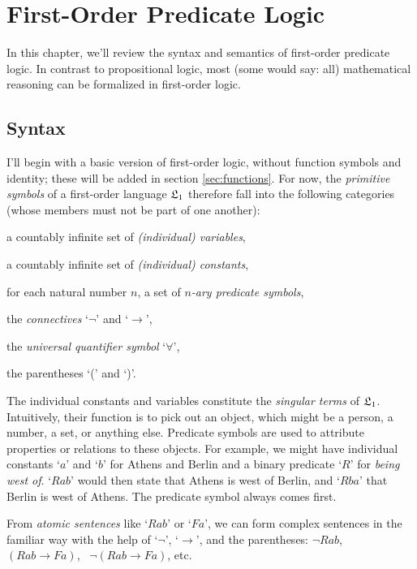 \setcounter{chapter}{1}
\chapter{First-Order Predicate Logic}

In this chapter,
we'll review the syntax and semantics of first-order predicate logic.
In contrast to propositional logic,
most
(some would say: all)
mathematical reasoning can be formalized in first-order logic.

\section{Syntax}\label{sec:syntax1}

I'll begin with a basic version of first-order logic,
without function symbols and identity;
these will be added in section \ref{sec:functions}.
For now,
the \emph{primitive symbols} of a first-order language $\mathfrak{L}_1$
therefore fall into
the following categories
(whose members must not be part of one another):
%
\begin{itemize*}
\item a countably infinite set of \textit{(individual) variables},
\item a countably infinite set of \textit{(individual) constants},
\item for each natural number $n$, a set of \textit{$n$-ary predicate symbols},
\item the \textit{connectives} `$\neg$' and `$\to$',
\item the \textit{universal quantifier symbol} `$\forall$',
\item the parentheses `(' and `)'.
\end{itemize*}

The individual constants and variables constitute the \emph{singular terms} of $\mathfrak{L}_1$.
Intuitively,
their function is to pick out an object,
which might be a person, a number, a set, or anything else.
Predicate symbols are used to attribute properties or relations to these objects.
For example,
we might have individual constants `$a$' and `$b$' for Athens and Berlin
and a binary predicate `$R$' for \emph{being west of}.
`$Rab$' would then state that Athens is west of Berlin,
and `$Rba$' that Berlin is west of Athens.
The predicate symbol always comes first.

From \emph{atomic sentences} like `$Rab$' or `$Fa$',
we can form complex sentences in the familiar way
with the help of `$\neg$', `$\to$', and the parentheses:
$\neg Rab$, \, $(Rab \to Fa)$, \, $\neg(Rab \to Fa)$, etc.

